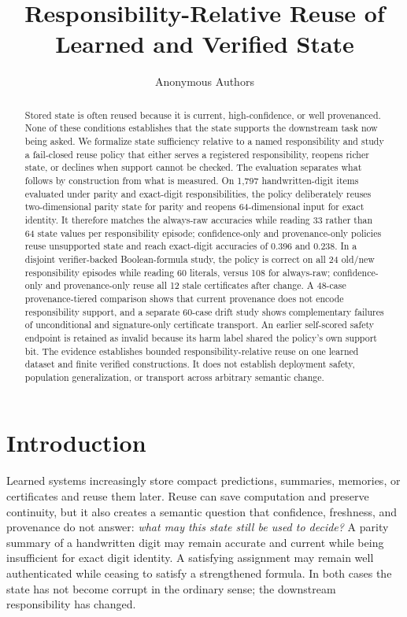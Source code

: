 \documentclass[10pt]{article}
\title{Responsibility-Relative Reuse of Learned and Verified State}
\author{Anonymous Authors}
\begin{document}
\maketitle

\begin{abstract}
Stored state is often reused because it is current, high-confidence, or well provenanced. None of these conditions establishes that the state supports the downstream task now being asked. We formalize state sufficiency relative to a named responsibility and study a fail-closed reuse policy that either serves a registered responsibility, reopens richer state, or declines when support cannot be checked. The evaluation separates what follows by construction from what is measured. On 1,797 handwritten-digit items evaluated under parity and exact-digit responsibilities, the policy deliberately reuses two-dimensional parity state for parity and reopens 64-dimensional input for exact identity. It therefore matches the always-raw accuracies while reading 33 rather than 64 state values per responsibility episode; confidence-only and provenance-only policies reuse unsupported state and reach exact-digit accuracies of 0.396 and 0.238. In a disjoint verifier-backed Boolean-formula study, the policy is correct on all 24 old/new responsibility episodes while reading 60 literals, versus 108 for always-raw; confidence-only and provenance-only reuse all 12 stale certificates after change. A 48-case provenance-tiered comparison shows that current provenance does not encode responsibility support, and a separate 60-case drift study shows complementary failures of unconditional and signature-only certificate transport. An earlier self-scored safety endpoint is retained as invalid because its harm label shared the policy's own support bit. The evidence establishes bounded responsibility-relative reuse on one learned dataset and finite verified constructions. It does not establish deployment safety, population generalization, or transport across arbitrary semantic change.
\end{abstract}

\section{Introduction}

Learned systems increasingly store compact predictions, summaries, memories, or certificates and reuse them later. Reuse can save computation and preserve continuity, but it also creates a semantic question that confidence, freshness, and provenance do not answer: \emph{what may this state still be used to decide?} A parity summary of a handwritten digit may remain accurate and current while being insufficient for exact digit identity. A satisfying assignment may remain well authenticated while ceasing to satisfy a strengthened formula. In both cases the state has not become corrupt in the ordinary sense; the downstream responsibility has changed.
\end{document}
